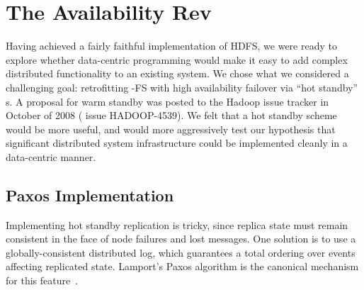 \section{The Availability Rev}
\label{sec:rely}



% 
Having achieved a fairly faithful implementation of HDFS, we were ready to
explore whether data-centric programming would make it easy to add complex
distributed functionality to an existing system.  We chose what we considered a
challenging goal: retrofitting \BOOM-FS with high availability failover via
``hot standby'' {\NN}s.  A proposal for warm standby was posted to the Hadoop
issue tracker in October of 2008 (\cite{jira} issue HADOOP-4539). We felt that a
hot standby scheme would be more useful, and would more aggressively test our
hypothesis that significant distributed system infrastructure could be
implemented cleanly in a data-centric manner.

\subsection{Paxos Implementation}
Implementing hot standby replication is tricky, since replica state must remain
consistent in the face of node failures and lost messages. One solution is to
use a globally-consistent distributed log, which guarantees a total ordering
over events affecting replicated state. Lamport's Paxos algorithm is the
canonical mechanism for this feature~\cite{part-time}.


